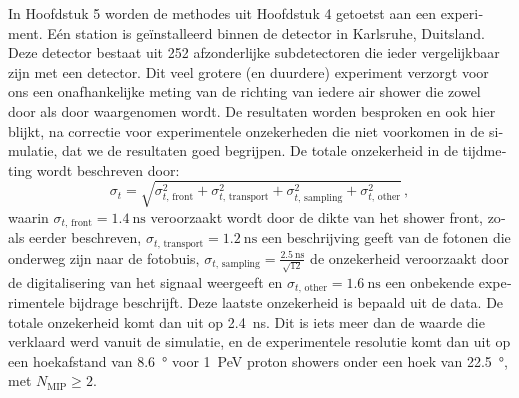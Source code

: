 \begin{otherlanguage}{dutch}
In Hoofdstuk 5 worden de methodes uit Hoofdstuk 4 getoetst aan een
experiment.  Eén \hisparc station is geïnstalleerd binnen de \kascade
detector in Karlsruhe, Duitsland.  Deze detector bestaat uit 252
afzonderlijke subdetectoren die ieder vergelijkbaar zijn met een \hisparc
detector.  Dit veel grotere (en duurdere) experiment verzorgt voor ons een
onafhankelijke meting van de richting van iedere air shower die zowel door
\kascade als door \hisparc waargenomen wordt.  De resultaten worden
besproken en ook hier blijkt, na correctie voor experimentele onzekerheden
die niet voorkomen in de simulatie, dat we de resultaten goed begrijpen.
De totale onzekerheid in de tijdmeting wordt beschreven door:
\begin{equation*}
\sigma_t = \sqrt{\sigma_{t,\, \mathrm{front}}^2 + \sigma_{t,\,
\mathrm{transport}}^2 + \sigma_{t,\, \mathrm{sampling}}^2 + \sigma_{t,\,
\mathrm{other}}^2}\,,
\end{equation*}
waarin $\sigma_{t,\, \mathrm{front}} = \SI{1.4}{\nano\second}$ veroorzaakt
wordt door de dikte van het shower front, zoals eerder beschreven,
$\sigma_{t,\, \mathrm{transport}} = \SI{1.2}{\nano\second}$ een
beschrijving geeft van de fotonen die onderweg zijn naar de fotobuis,
$\sigma_{t,\, \mathrm{sampling}} =
\frac{\SI{2.5}{\nano\second}}{\sqrt{12}}$ de onzekerheid veroorzaakt door
de digitalisering van het signaal weergeeft en $\sigma_{t,\,
\mathrm{other}} = \SI{1.6}{\nano\second}$ een onbekende experimentele
bijdrage beschrijft.  Deze laatste onzekerheid is bepaald uit de data.  De
totale onzekerheid komt dan uit op \SI{2.4}{\nano\second}.  Dit is iets
meer dan de waarde die verklaard werd vanuit de simulatie, en de
experimentele resolutie komt dan uit op een hoekafstand van
\SI{8.6}{\degree} voor \SI{1}{\peta\electronvolt} proton showers onder een
hoek van \SI{22.5}{\degree}, met $N_\mathrm{MIP} \geq 2$.


\end{otherlanguage}
